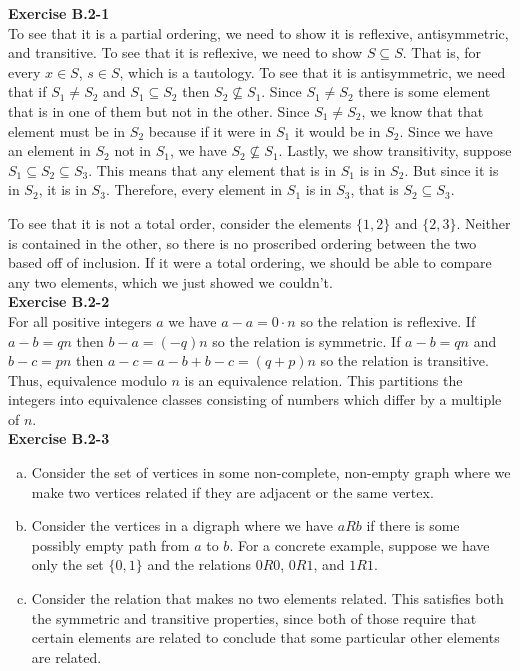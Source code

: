 \documentclass{article}
\begin{document}
\noindent\textbf{Exercise B.2-1}\\
To see that it is a partial ordering, we need to show it is reflexive, antisymmetric, and transitive. To see that it is reflexive, we need to show $S\subseteq S$. That is, for every $x\in S$, $s\in S$, which is a tautology. To see that it is antisymmetric, we need that if $S_1 \neq S_2$ and $S_1 \subseteq S_2$ then $S_2 \not \subseteq S_1$. Since $S_1\neq S_2$ there is some element that is in one of them but not in the other. Since $S_1 \neq S_2$, we know that that element must be in $S_2$ because if it were in $S_1$ it would be in $S_2$. Since we have an element in $S_2$ not in $S_1$, we have $S_2 \not\subseteq S_1$. Lastly, we show transitivity, suppose $S_1 \subseteq S_2 \subseteq S_3$. This means that any element that is in $S_1$ is in $S_2$. But since it is in $S_2$, it is in $S_3$. Therefore, every element in $S_1$ is in $S_3$, that is $S_2 \subseteq S_3$.


To see that it is not a total order, consider the elements $\{1,2\}$ and $\{2,3\}$. Neither is contained in the other, so there is no proscribed ordering between the two based off of inclusion. If it were a total ordering, we should be able to compare any two elements, which we just showed we couldn't.\\


\noindent\textbf{Exercise B.2-2}\\

For all positive integers $a$ we have $a - a = 0\cdot n$ so the relation is reflexive.  If $a-b = qn$ then $b-a = (-q)n$ so the relation is symmetric.  If $a - b = qn$ and $b-c = pn$ then $a - c = a - b + b - c = (q+p)n$ so the relation is transitive. Thus, equivalence modulo $n$ is an equivalence relation.  This partitions the integers into equivalence classes consisting of numbers which differ by a multiple of $n$.  \\

\noindent\textbf{Exercise B.2-3}\\
\begin{enumerate}[a.]
\item
Consider the set of vertices in some non-complete, non-empty graph where we make two vertices related if they are adjacent or the same vertex.
\item
Consider the vertices in a digraph where we have $aRb$ if there is some possibly empty path from $a$ to $b$. For a concrete example, suppose we have only the set $\{0,1\}$ and the relations $0R0$, $0R1$, and $1R1$.
\item
Consider the relation that makes no two elements related. This satisfies both the symmetric and transitive properties, since both of those require that certain elements are related to conclude that some particular other elements are related.\\

\end{enumerate}
\end{document}
